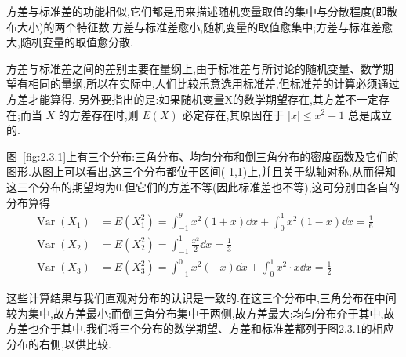 方差与标准差的功能相似,它们都是用来描述随机变量取值的集中与分散程度(即散布大小)的两个特征数.方差与标准差愈小,随机变量的取值愈集中;方差与标准差愈大,随机变量的取值愈分散.

方差与标准差之间的差别主要在量纲上,由于标准差与所讨论的随机变量、数学期望有相同的量纲,所以在实际中,人们比较乐意选用标准差,但标准差的计算必须通过方差才能算得.
另外要指出的是:如果随机变量X的数学期望存在,其方差不一定存在;而当 $ X $ 的方差存在时,则 $ E(X) $ 必定存在,其原因在于 $ |x| \leqslant x^{2}+1 $ 总是成立的.

\begin{example}\label{exam:2.3.1}
	图~\ref{fig:2.3.1}上有三个分布:三角分布、均匀分布和倒三角分布的密度函数及它们的图形.从图上可以看出,这三个分布都位于区间(-1,1)上,并且关于纵轴对称,从而得知这三个分布的期望均为0.但它们的方差不等(因此标准差也不等),这可分别由各自的分布算得
	\[
	\begin{aligned}
	\operatorname{Var}\left(X_{1}\right)&=E\left(X_{1}^{2}\right)=\int_{-1}^{\theta} x^{2}(1+x) \dd x+\int_{0}^{1} x^{2}(1-x) \dd x=\frac{1}{6}\\
	\operatorname{Var}\left(X_{2}\right) &=E\left(X_{2}^{2}\right)=\int_{-1}^{1} \frac{x^{2}}{2} \dd x=\frac{1}{3} \\ 
	\operatorname{Var}\left(X_{3}\right) &=E\left(X_{3}^{2}\right)=\int_{-1}^{0} x^{2}(-x) \dd x+\int_{0}^{1} x^{2} \cdot x \dd x=\frac{1}{2} 
	\end{aligned}
	\]
	
	这些计算结果与我们直观对分布的认识是一致的.在这三个分布中,三角分布在中间较为集中,故方差最小;而倒三角分布集中于两侧,故方差最大;均匀分布介于其中,故方差也介于其中.我们将三个分布的数学期望、方差和标准差都列于图2.3.1的相应分布的右侧,以供比较.
	
\end{example}


